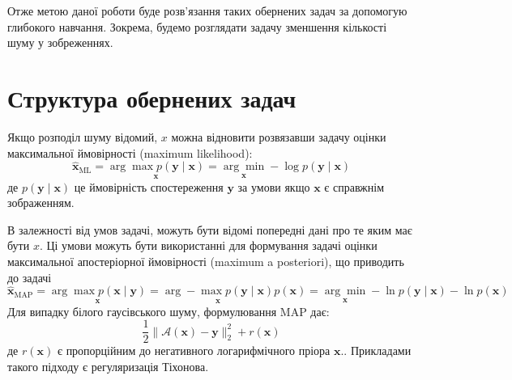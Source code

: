 \documentclass[14pt,a4paper]{extarticle}
\newcounter{e}
\numberwithin{equation}{section}
\numberwithin{figure}{section}
\begin{document}
	Отже метою даної роботи буде розв'язання таких обернених задач за допомогую глибокого навчання. Зокрема, будемо розглядати задачу зменшення кількості шуму у зобреженнях.

		
		
	\newpage
	\thispagestyle{empty}
	\section{Структура обернених задач}

	
	Якщо розподіл шуму відомий, $x$ можна відновити розвязавши задачу оцінки максимальної ймовірності (maximum likelihood):
	$$
	\hat{\boldsymbol{x}}_{\mathrm{ML}}
	=\underset{\boldsymbol{x}}{\arg \max{ p (\boldsymbol{y} \mid \boldsymbol{x}) }}
	=\underset{\boldsymbol{x}}{\arg \min }-\log p(\boldsymbol{y} \mid \boldsymbol{x})
	$$
	де $p(\boldsymbol{y} \mid \boldsymbol{x})$ це ймовірність спостереження $\boldsymbol{y}$ за умови якщо $\boldsymbol{x}$ є справжнім зображенням.
	
	В залежності від умов задачі, можуть бути відомі попередні дані про те яким має бути $x$. Ці умови можуть бути використанні для формування  задачі оцінки максимальної апостеріорної ймовірності (maximum a posteriori), що приводить до задачі
	$$
	\hat{\boldsymbol{x}}_{\mathrm{MAP}}
	=\underset{\boldsymbol{x}}{\arg \max{ p(\boldsymbol{x} \mid \boldsymbol{y}) }}
	=\underset{\boldsymbol{x}}{\arg -\max{ p(\boldsymbol{y} \mid \boldsymbol{x})} } p(\boldsymbol{x})
	=\underset{\boldsymbol{x}}{\arg \min }-\ln p(\boldsymbol{y} \mid \boldsymbol{x})-\ln p(\boldsymbol{x})
	$$
	Для випадку білого гаусівського шуму, формулювання MAP дає:
	\begin{equation}
	\label{MAP-avgn}
	 \frac{1}{2}\|\mathcal{A}(\boldsymbol{x})-\boldsymbol{y}\|_{2}^{2}+r(\boldsymbol{x})
	\end{equation}
	де  $r(\boldsymbol{x})$ є пропорційним до негативного логарифмічного пріора $\boldsymbol{x} .$. Прикладами такого підходу є регуляризація Тіхонова. 
	
\end{document}
